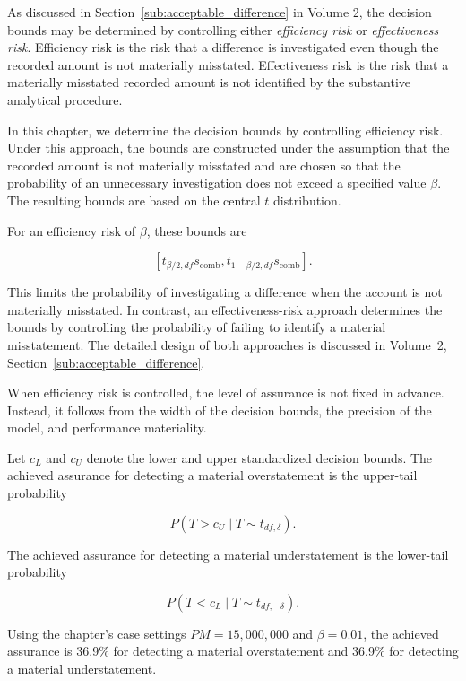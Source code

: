 As discussed in Section~\ref{sub:acceptable_difference} in Volume 2, the decision bounds may be determined by controlling either \emph{efficiency risk} or \emph{effectiveness risk}. Efficiency risk is the risk that a difference is investigated even though the recorded amount is not materially misstated. Effectiveness risk is the risk that a materially misstated recorded amount is not identified by the substantive analytical procedure.

In this chapter, we determine the decision bounds by controlling efficiency risk. Under this approach, the bounds are constructed under the assumption that the recorded amount is not materially misstated and are chosen so that the probability of an unnecessary investigation does not exceed a specified value \(\beta\). The resulting bounds are based on the central \(t\) distribution.

For an efficiency risk of \(\beta\), these bounds are

\begin{equation}
\left[
t_{\beta/2,df}s_{\text{comb}},
t_{1-\beta/2,df}s_{\text{comb}}
\right].
\end{equation}

This limits the probability of investigating a difference when the account is not materially misstated. In contrast, an effectiveness-risk approach determines the bounds by controlling the probability of failing to identify a material misstatement. The detailed design of both approaches is discussed in Volume~2, Section~\ref{sub:acceptable_difference}.

When efficiency risk is controlled, the level of assurance is not fixed in advance. Instead, it follows from the width of the decision bounds, the precision of the model, and performance materiality.

Let $c_L$ and $c_U$ denote the lower and upper standardized decision bounds. The achieved assurance for detecting a material overstatement is the upper-tail probability

\begin{equation}
P(T > c_U \mid T \sim t_{df,\delta}).
\end{equation}

The achieved assurance for detecting a material understatement is the lower-tail probability

\begin{equation}
P(T < c_L \mid T \sim t_{df,-\delta}).
\end{equation}

Using the chapter's case settings $PM = 15,\!000,\!000$ and $\beta = 0.01$, the achieved assurance is 36.9\% for detecting a material overstatement and 36.9\% for detecting a material understatement.

